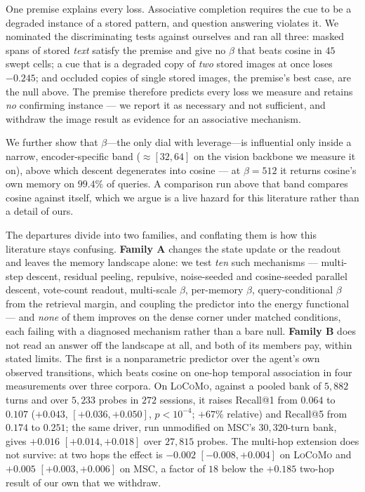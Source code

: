 One premise explains every loss. Associative completion requires the cue to be a degraded
instance of a stored pattern, and question answering violates it. We nominated the
discriminating tests against ourselves and ran all three: masked spans of stored
\emph{text} satisfy the premise and give no $\beta$ that beats cosine in $45$ swept cells;
a cue that is a degraded copy of \emph{two} stored images at once loses $-0.245$; and
occluded copies of single stored images, the premise's best case, are the null above.
The premise therefore predicts every loss we measure and retains \emph{no} confirming
instance --- we report it as necessary and not sufficient, and withdraw the image result
as evidence for an associative mechanism.

We further show that $\beta$---the only dial with leverage---is influential only inside a
narrow, encoder-specific band (${\approx}[32,64]$ on the vision backbone we measure it on), above which
descent degenerates into cosine --- at $\beta{=}512$ it returns cosine's own
memory on $99.4\%$ of queries. A comparison run above that band compares cosine against itself, which we
argue is a live hazard for this literature rather than a detail of ours.

The departures divide into two families, and conflating them is how this literature stays
confusing. \textbf{Family A} changes the state update or the readout and leaves the memory
landscape alone: we test \emph{ten} such mechanisms --- multi-step descent, residual peeling,
repulsive, noise-seeded and cosine-seeded parallel descent, vote-count readout, multi-scale
$\beta$, per-memory $\beta$, query-conditional $\beta$ from the retrieval margin, and
coupling the predictor into the energy functional --- and \emph{none} of them improves on the
dense corner under matched conditions, each failing with a diagnosed mechanism rather than a
bare null. \textbf{Family B} does not read an answer off the landscape at all, and both of
its members pay, within stated limits. The first is a nonparametric
predictor over the agent's own observed transitions, which beats cosine on one-hop temporal
association in four measurements over three corpora. On
\textsc{LoCoMo}, against a pooled bank of $5{,}882$ turns and over $5{,}233$ probes in $272$
sessions, it raises Recall@1 from $0.064$ to $0.107$ ($+0.043$, $[+0.036,+0.050]$,
$p<10^{-4}$; $+67\%$ relative) and Recall@5 from $0.174$ to $0.251$; the same driver, run
unmodified on \textsc{MSC}'s $30{,}320$-turn bank, gives $+0.016$ $[+0.014,+0.018]$ over
$27{,}815$ probes. The multi-hop extension does not survive: at two hops the effect is
$-0.002$ $[-0.008,+0.004]$ on \textsc{LoCoMo} and $+0.005$ $[+0.003,+0.006]$ on
\textsc{MSC}, a factor of $18$ below the $+0.185$ two-hop result of our own that we
withdraw.

